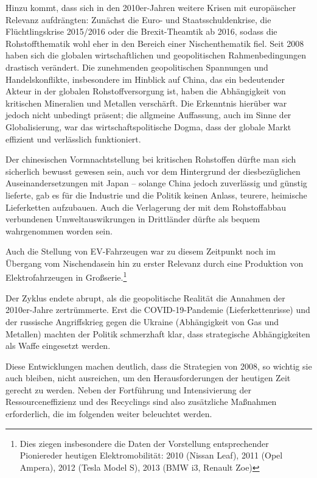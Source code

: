 \documentclass[12pt,a4paper,oneside]{book} %
\begin{document}
Hinzu kommt, dass sich in den 2010er-Jahren weitere Krisen mit europäischer Relevanz aufdrängten: Zunächst die Euro- und Staatsschuldenkrise, die Flüchtlingskrise 2015/2016 oder die Brexit-Theamtik ab 2016, sodass die Rohstoffthematik wohl eher in den Bereich einer Nischenthematik fiel. Seit 2008 haben sich die globalen wirtschaftlichen und geopolitischen Rahmenbedingungen drastisch verändert. Die zunehmenden geopolitischen Spannungen und Handelskonflikte, insbesondere im Hinblick auf China, das ein bedeutender Akteur in der globalen Rohstoffversorgung ist, haben die Abhängigkeit von kritischen Mineralien und Metallen verschärft. Die Erkenntnis hierüber war jedoch nicht unbedingt präsent; die allgmeine Auffassung, auch im Sinne der Globalisierung, war das wirtschaftspolitische Dogma, dass der globale Markt effizient und verlässlich funktioniert. 

Der chinesischen Vormnachtstellung bei kritischen Rohstoffen dürfte man sich sicherlich bewusst gewesen sein, auch vor dem Hintergrund der diesbezüglichen Auseinandersetzungen mit Japan -- solange China jedoch zuverlässig und günstig lieferte, gab es für die Industrie und die Politik keinen Anlass, teurere, heimische Lieferketten aufzubauen. Auch die Verlagerung der mit dem Rohstoffabbau verbundenen Umweltauswikrungen in Drittländer dürfte als bequem wahrgenommen worden sein.

Auch die Stellung von EV-Fahrzeugen war zu diesem Zeitpunkt noch im Übergang vom Nischendasein hin zu erster Relevanz durch eine Produktion von Elektrofahrzeugen in Großserie.\footnote{Dies ziegen insbesondere die Daten der Vorstellung entsprechender \glqq Pioniere\grqq der heutigen Elektromobilität: 2010 (Nissan Leaf), 2011 (Opel Ampera), 2012 (Tesla Model S), 2013 (BMW i3, Renault Zoe)}

Der Zyklus endete abrupt, als die geopolitische Realität die Annahmen der 2010er-Jahre zertrümmerte. Erst die COVID-19-Pandemie (Lieferkettenrisse) und der russische Angriffskrieg gegen die Ukraine (Abhängigkeit von Gas und Metallen) machten der Politik schmerzhaft klar, dass strategische Abhängigkeiten als Waffe eingesetzt werden.
	

	
Diese Entwicklungen machen deutlich, dass die Strategien von 2008, so wichtig sie auch bleiben, nicht ausreichen, um den Herausforderungen der heutigen Zeit gerecht zu werden. Neben der Fortführung und Intensivierung der Ressourceneffizienz und des Recyclings sind also zusätzliche Maßnahmen erforderlich, die im folgenden weiter beleuchtet werden.
	
\end{document}
